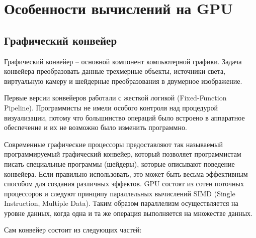 \newpage
\section{Особенности вычислений на GPU}

\subsection{Графический конвейер}

Графический конвейер -- основной компонент компьютерной графики. Задача конвейера преобразовать
данные трехмерные объекты, источники света, виртуальную камеру и шейдерные преобразования в 
двумерное изображение.

Первые версии конвейеров работали с жесткой логикой (Fixed-Function Pipeline).
Программисты не имели особого контроля над процедурой визуализации, потому что большинство
операций было встроено в аппаратное обеспечение и их не возможно было изменить программно.

Современные графические процессоры предоставляют так называемый программируемый графический
конвейер, который позволяет программистам писать специальные программы (шейдеры), которые
описывают поведение конвейера. Если правильно использовать, это может быть весьма эффективным
способом для создания различных эффектов. GPU состоят из сотен поточных процессоров и следуют
принципу параллельных вычислений SIMD (Single Instruction, Multiple Data). Таким образом
параллелизм осуществляется на уровне данных, когда одна и та же операция выполняется
на множестве данных.

Сам конвейер состоит из следующих частей:


